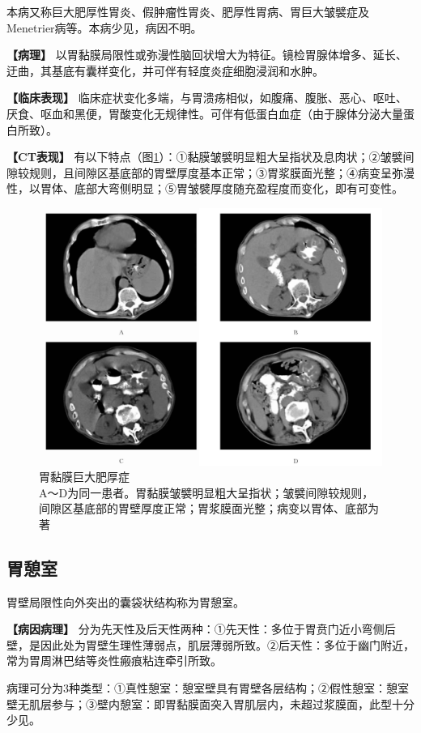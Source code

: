 本病又称巨大肥厚性胃炎、假肿瘤性胃炎、肥厚性胃病、胃巨大皱襞症及Menetrier病等。本病少见，病因不明。

\textbf{【病理】}
以胃黏膜局限性或弥漫性脑回状增大为特征。镜检胃腺体增多、延长、迂曲，其基底有囊样变化，并可伴有轻度炎症细胞浸润和水肿。

\textbf{【临床表现】}
临床症状变化多端，与胃溃疡相似，如腹痛、腹胀、恶心、呕吐、厌食、呕血和黑便，胃酸变化无规律性。可伴有低蛋白血症（由于腺体分泌大量蛋白所致）。

\textbf{【CT表现】}
有以下特点（图\ref{fig17-9}）：①黏膜皱襞明显粗大呈指状及息肉状；②皱襞间隙较规则，且间隙区基底部的胃壁厚度基本正常；③胃浆膜面光整；④病变呈弥漫性，以胃体、底部大弯侧明显；⑤胃皱襞厚度随充盈程度而变化，即有可变性。

\begin{figure}[!htbp]
 \centering
 \includegraphics[width=.7\textwidth,height=\textheight,keepaspectratio]{./images/Image00360.jpg}
 \captionsetup{justification=centering}
 \caption{胃黏膜巨大肥厚症\\{\small A～D为同一患者。胃黏膜皱襞明显粗大呈指状；皱襞间隙较规则，间隙区基底部的胃壁厚度正常；胃浆膜面光整；病变以胃体、底部为著}}
 \label{fig17-9}
  \end{figure} 

\subsection{胃憩室}

胃壁局限性向外突出的囊袋状结构称为胃憩室。

\textbf{【病因病理】}
分为先天性及后天性两种：①先天性：多位于胃贲门近小弯侧后壁，是因此处为胃壁生理性薄弱点，肌层薄弱所致。②后天性：多位于幽门附近，常为胃周淋巴结等炎性瘢痕粘连牵引所致。

病理可分为3种类型：①真性憩室：憩室壁具有胃壁各层结构；②假性憩室：憩室壁无肌层参与；③壁内憩室：即胃黏膜面突入胃肌层内，未超过浆膜面，此型十分少见。

